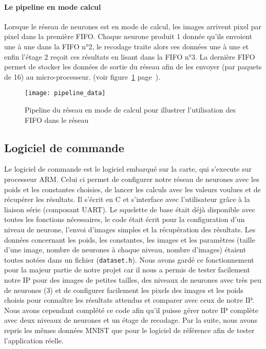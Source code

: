 	\paragraph{Le pipeline en mode calcul}
	Lorsque le réseau de neurones est en mode de calcul, les images arrivent pixel par pixel dans la première FIFO. 
	Chaque neurone produit 1 donnée qu'ils envoient une à une dans la FIFO n°2, le recodage traite alors ces 
	données une à une et enfin l'étage 2 reçoit ces résultats en lisant dans la FIFO n°3. La dernière FIFO 
	permet de stocker les données de sortie du réseau afin de les envoyer (par paquets de 16) au micro-processeur. 
	(voir figure~\ref{fig:pipeline_data} page~\pageref{fig:pipeline_data}).
	\begin{figure}[h!]
		\texttt{[image: pipeline\_data]}
		\caption{Pipeline du réseau en mode de calcul pour illustrer l'utilisation des FIFO dans le réseau}
		\label{fig:pipeline_data}
	\end{figure}

\subsection{Logiciel de commande}
Le logiciel de commande est le logiciel embarqué sur la carte, qui s'execute
sur processeur ARM. Celui ci permet de configurer notre réseau de neurones avec
les poids et les constantes choisies, de lancer les calculs avec les valeurs
voulues et de récupérer les résultats. Il s'écrit en C et s'interface avec
l'utilisateur grâce à la liaison série (composant UART). Le squelette de base
était déjà disponible avec toutes les fonctions nécessaires, le code était
écrit pour la configuration d'un niveau de neurone, l'envoi d'images simples et
la récupération des résultats. Les données
concernant les poids, les constantes, les images et les paramètres (taille d'une
image, nombre de neurones à chaque niveau, nombre d'images) étaient toutes notées
dans un fichier (\texttt{dataset.h}). Nous avons gardé ce fonctionnement pour la
majeur partie de notre projet car il nous a permis de tester facilement notre
IP pour des images de petites tailles, des niveaux de neurones avec très peu
de neurones (3) et de configurer facilement les pixels des images et les poids
choisis pour connaître les résultats attendus et comparer avec ceux de notre IP.
Nous avons cependant complété ce code afin qu'il puisse gérer notre IP complète
avec deux niveaux de neurones et un étage de recodage.
Par la suite, nous avons repris les mêmes données MNIST que pour le logiciel de
référence afin de tester l'application réelle. \\

